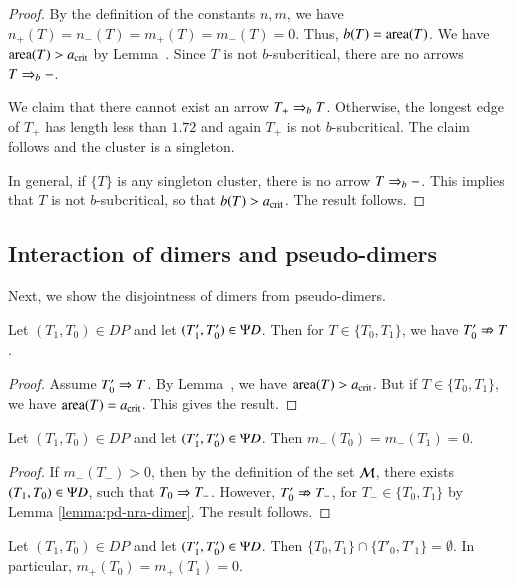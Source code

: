 \begin{proof}  
  By the definition of the constants $n,m$, we have $n_+(T)=n_-(T) =
  m_+(T)=m_-(T)=0$.  Thus, $b(T)={\operatorname{area}}(T)$.  We have ${\operatorname{area}}(T) >
  a_\text{crit}$ by Lemma~.  Since $T$ is not $b$-subcritical,
  there are no arrows $T\Rightarrow_{b} -$.

  We claim that there cannot exist an arrow $T_+\Rightarrow_{b} T$.  Otherwise,
  the longest edge of $T_+$ has length less than $1.72$ and again
  $T_+$ is not $b$-subcritical.  The claim follows and the cluster is
  a singleton.

  In general, if $\{T\}$ is any singleton cluster, there is no arrow
  $T\Rightarrow_{b} -$.  This implies that $T$ is not $b$-subcritical, so that
  $b(T) > a_\text{crit}$.  The result follows.
\end{proof}

\subsection{Interaction of dimers and pseudo-dimers}

Next, we show the disjointness of dimers from pseudo-dimers.

\begin{lemma}\label{lemma:pd-nra-dimer}
  Let $(T_1,T_0)\in DP$ and let $(T'_1,T'_0)\in\Psi D$.  Then for
  $T\in\{T_0,T_1\}$, we have $T'_0\nRightarrow T$.
\end{lemma}

\begin{proof} 
  Assume $T'_0\Rightarrow T$.  By Lemma~, we have
  ${\operatorname{area}}(T)>a_\text{crit}$.  But if $T\in\{T_0,T_1\}$, we have
  ${\operatorname{area}}(T)=a_\text{crit}$.  This gives the result.
\end{proof}

\begin{lemma}  
  Let $(T_1,T_0)\in DP$ and let $(T'_1,T'_0)\in \Psi D$.  Then
  $m_-(T_0)=m_-(T_1)=0$.
\end{lemma}

\begin{proof}  
  If $m_-(T_-)>0$, then by the definition of the set $\mathcal M$, there
  exists $(T_1,T_0)\in \Psi D$, such that $T_0\Rightarrow T_-$.  However,
  $T'_0\nRightarrow T_-$, for $T_-\in\{T_0,T_1\}$ by Lemma
  \ref{lemma:pd-nra-dimer}.  The result follows.
\end{proof}

\begin{lemma}  
  Let $(T_1,T_0)\in DP$ and let $(T'_1,T'_0)\in\Psi D$.  Then
  $\{T_0,T_1\}\cap \{T'_0,T'_1\} = \emptyset$.  In particular,
  $m_+(T_0) = m_+(T_1)=0$.
\end{lemma}

